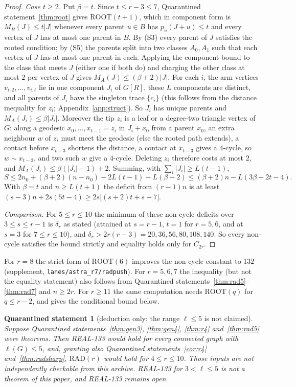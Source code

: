 \documentclass[11pt]{amsart}
\newtheorem{qrecord}[theorem]{Quarantined statement}
\theoremstyle{definition}
\theoremstyle{remark}
\newcommand{\lr}{\ell}
\newcommand{\pp}{p}
\newcommand{\RAD}{\mathrm{RAD}}
\newcommand{\ROOT}{\mathrm{ROOT}}
\begin{document}
\begin{proof}
\emph{Case $t\ge2$.} Put $\beta=t$. Since $t\le r-3\le7$, Quarantined statement~\ref{thm:root} gives $\ROOT(t+1)$, which in component form is $M_B(J)\le t|J|$ whenever every parent $u\in B$ has $\pp_u(J+u)\le t$ and every vertex of $J$ has at most one parent in $B$. By (S3) every parent of $J$ satisfies the rooted condition; by (S5) the parents split into two classes $A_0,A_1$ such that each vertex of $J$ has at most one parent in each. Applying the component bound to the class that meets $J$ (either one if both do) and charging the other class at most $2$ per vertex of $J$ gives $M_A(J)\le(\beta+2)|J|$. For each $i$, the arm vertices $v_{i,2},\dots,v_{i,t}$ lie in one component $J_i$ of $G[R]$, these $L$ components are distinct, and all parents of $J_i$ have the singleton trace $\{c_i\}$ (this follows from the distance inequality for $z_i$; Appendix~\ref{app:struct}). So $J_i$ has unique parents and $M_A(J_i)\le\beta|J_i|$. Moreover the tip $z_i$ is a leaf or a degree-two triangle vertex of $G$: along a geodesic $x_0,\dots,x_{t-1}=z_i$ in $J_i+x_0$ from a parent $x_0$, an extra neighbour $w$ of $z_i$ must meet the geodesic (else the rooted path extends), a contact before $x_{t-3}$ shortens the distance, a contact at $x_{t-3}$ gives a $4$-cycle, so $w\sim x_{t-2}$, and two such $w$ give a $4$-cycle. Deleting $z_i$ therefore costs at most $2$, and $M_A(J_i)\le\beta(|J_i|-1)+2$. Summing, with $\sum_i|J_i|\ge L(t-1)$,
\[
S\le2n_0+(\beta+2)(n-n_0)-2L(t-1)-L(\beta-2)\le(\beta+2)n-L(3\beta+2t-4).
\]
With $\beta=t$ and $n\ge L(t+1)$ the deficit from $(r-1)n$ is at least $(s-3)n+2s(5t-4)\ge2s\bigl[(s+2)t+s-7\bigr]$.

\emph{Comparison.} For $5\le r\le10$ the minimum of these non-cycle deficits over $3\le s\le r-1$ is $\delta_r$ as stated (attained at $s=r-1$, $t=1$ for $r=5,6$, and at $s=3$ for $7\le r\le10$), and $\delta_r>2r(r-3)=20,36,56,80,108,140$. So every non-cycle satisfies the bound strictly and equality holds only for $C_{2r}$.
\end{proof}

For $r=8$ the strict form of $\ROOT(6)$ improves the non-cycle constant to $132$ (supplement, \nolinkurl{lanes/astra_r7/radpush}). For $r=5,6,7$ the inequality (but not the equality statement) also follows from Quarantined statements~\ref{thm:rad5}--\ref{thm:rad7} and $n\ge2r$. For $r\ge11$ the same computation needs $\ROOT(q)$ for $q\le r-2$, and gives the conditional bound below.

\begin{qrecord}[deduction only; the range $\lr\le 5$ is not claimed]\label{cor:five}
Suppose Quarantined statements~\ref{thm:gen3}, \ref{thm:gen4}, \ref{thm:r4} and~\ref{thm:rad5} were theorems. Then REAL-133 would hold for every connected graph with $\lr(G)\le5$, and, granting also Quarantined statements~\ref{cor:r4} and~\ref{thm:radsharp}, $\RAD(r)$ would hold for $4\le r\le10$. Those inputs are not independently checkable from this archive. REAL-133 for $3<\lr\le5$ is not a theorem of this paper, and REAL-133 remains open.
\end{qrecord}
\end{document}
